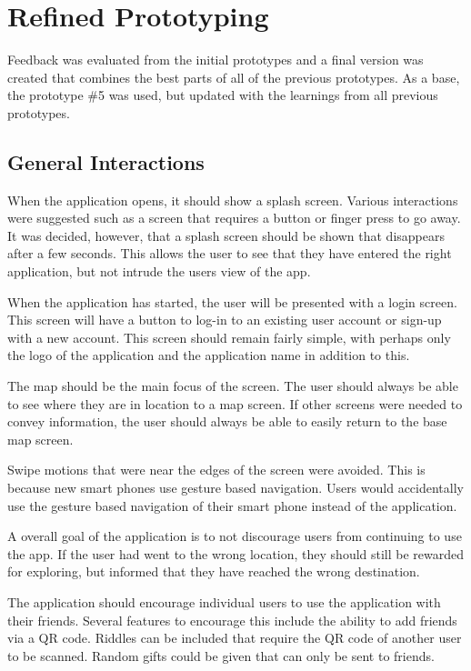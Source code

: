 \documentclass[10pt,twocolumn]{article} %
\begin{document}
\section*{Refined Prototyping}

Feedback was evaluated from the initial prototypes and a final version was created that combines the best parts of all of the previous prototypes.
As a base, the prototype \#5 was used, but updated with the learnings from all previous prototypes. 

\subsection*{General Interactions} 
When the application opens, it should show a splash screen. Various interactions were suggested such as a screen that requires a button or finger press to go away. It was decided, however, that a splash screen should be shown that disappears after a few seconds. This allows the user to see that they have entered the right application, but not intrude the users view of the app.

When the application has started, the user will be presented with a login screen. This screen will have a button to log-in to an existing user account or sign-up with a new account. This screen should remain fairly simple, with perhaps only the logo of the application and the application name in addition to this.

The map should be the main focus of the screen. The user should always be able to see where they are in location to a map screen. If other screens were needed to convey information, the user should always be able to easily return to the base map screen.

Swipe motions that were near the edges of the screen were avoided. This is because new smart phones use gesture based navigation. Users would accidentally use the gesture based navigation of their smart phone instead of the application.

A overall goal of the application is to not discourage users from continuing to use the app. If the user had went to the wrong location, they should still be rewarded for exploring, but informed that they have reached the wrong destination.

The application should encourage individual users to use the application with their friends. Several features to encourage this include the ability to add friends via a QR code. Riddles can be included that require the QR code of another user to be scanned. Random gifts could be given that can only be sent to friends.
\end{document}
